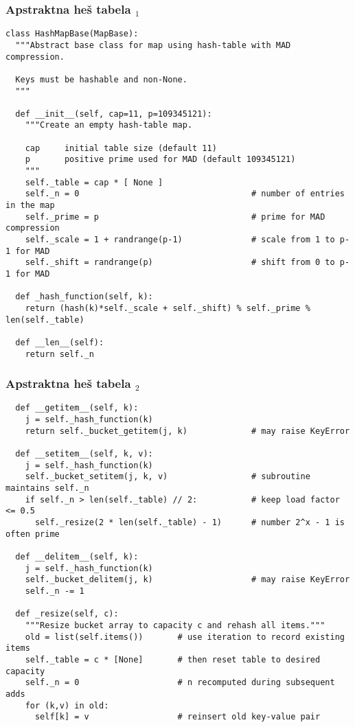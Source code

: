 \documentclass[compress]{beamer}
\begin{document}
\begin{frame}
  \frametitle{Apstraktna heš tabela $_1$}
\begin{verbatim}
class HashMapBase(MapBase):
  """Abstract base class for map using hash-table with MAD compression.

  Keys must be hashable and non-None.
  """

  def __init__(self, cap=11, p=109345121):
    """Create an empty hash-table map.

    cap     initial table size (default 11)
    p       positive prime used for MAD (default 109345121)
    """
    self._table = cap * [ None ]
    self._n = 0                                   # number of entries in the map
    self._prime = p                               # prime for MAD compression
    self._scale = 1 + randrange(p-1)              # scale from 1 to p-1 for MAD
    self._shift = randrange(p)                    # shift from 0 to p-1 for MAD

  def _hash_function(self, k):
    return (hash(k)*self._scale + self._shift) % self._prime % len(self._table)

  def __len__(self):
    return self._n
\end{verbatim}
\end{frame}

\begin{frame}
  \frametitle{Apstraktna heš tabela $_2$}
\begin{verbatim}
  def __getitem__(self, k):
    j = self._hash_function(k)
    return self._bucket_getitem(j, k)             # may raise KeyError

  def __setitem__(self, k, v):
    j = self._hash_function(k)
    self._bucket_setitem(j, k, v)                 # subroutine maintains self._n
    if self._n > len(self._table) // 2:           # keep load factor <= 0.5
      self._resize(2 * len(self._table) - 1)      # number 2^x - 1 is often prime

  def __delitem__(self, k):
    j = self._hash_function(k)
    self._bucket_delitem(j, k)                    # may raise KeyError
    self._n -= 1

  def _resize(self, c):
    """Resize bucket array to capacity c and rehash all items."""
    old = list(self.items())       # use iteration to record existing items
    self._table = c * [None]       # then reset table to desired capacity
    self._n = 0                    # n recomputed during subsequent adds
    for (k,v) in old:
      self[k] = v                  # reinsert old key-value pair
\end{verbatim}
\end{frame}
\end{document}
